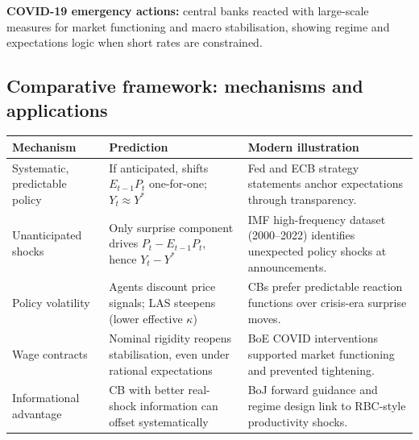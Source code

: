 \documentclass[
  letterpaper,
  DIV=11,
  numbers=noendperiod]{scrartcl}
\begin{document}
\textbf{COVID-19 emergency actions:} central banks reacted with
large-scale measures for market functioning and macro stabilisation,
showing regime and expectations logic when short rates are constrained.

\subsection{Comparative framework: mechanisms and
applications}\label{comparative-framework-mechanisms-and-applications}

\begin{longtable}[]{@{}
  >{\raggedright\arraybackslash}p{}
  >{\raggedright\arraybackslash}p{}
  >{\raggedright\arraybackslash}p{}@{}}
\toprule\noalign{}
\begin{minipage}[b]{\linewidth}\raggedright
Mechanism
\end{minipage} & \begin{minipage}[b]{\linewidth}\raggedright
Prediction
\end{minipage} & \begin{minipage}[b]{\linewidth}\raggedright
Modern illustration
\end{minipage} \\
\midrule\noalign{}
\endhead
\bottomrule\noalign{}
\endlastfoot
Systematic, predictable policy & If anticipated, shifts \(E_{t-1}P_t\)
one-for-one; \(Y_t \approx Y^*\) & Fed and ECB strategy statements
anchor expectations through transparency. \\
Unanticipated shocks & Only surprise component drives
\(P_t - E_{t-1}P_t\), hence \(Y_t - Y^*\) & IMF high-frequency dataset
(2000--2022) identifies unexpected policy shocks at announcements. \\
Policy volatility & Agents discount price signals; LAS steepens (lower
effective \(\kappa\)) & CBs prefer predictable reaction functions over
crisis-era surprise moves. \\
Wage contracts & Nominal rigidity reopens stabilisation, even under
rational expectations & BoE COVID interventions supported market
functioning and prevented tightening. \\
Informational advantage & CB with better real-shock information can
offset systematically & BoJ forward guidance and regime design link to
RBC-style productivity shocks. \\
\end{longtable}
\end{document}
